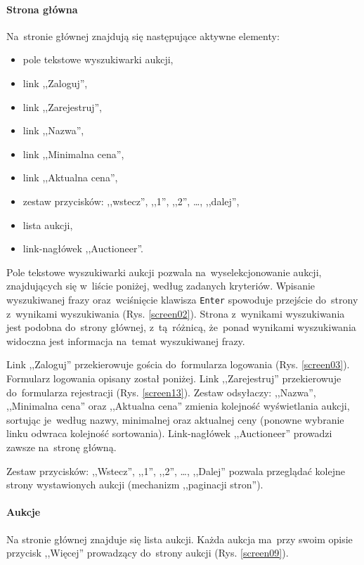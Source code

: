 \paragraph{Strona główna}

Na~stronie głównej znajdują się następujące aktywne elementy:

\begin{itemize}
  \item pole tekstowe wyszukiwarki aukcji,
  \item link ,,Zaloguj'',
  \item link ,,Zarejestruj'',
  \item link ,,Nazwa'',
  \item link ,,Minimalna cena'',
  \item link ,,Aktualna cena'',
  \item zestaw przycisków: ,,wstecz'', ,,1'', ,,2'', \ldots, ,,dalej'',
  \item lista aukcji,
  \item link-nagłówek ,,Auctioneer''.
\end{itemize}

Pole tekstowe wyszukiwarki aukcji pozwala na~wyselekcjonowanie aukcji, znajdujących się w~liście poniżej, według zadanych kryteriów. Wpisanie wyszukiwanej frazy oraz~wciśnięcie klawisza \texttt{Enter} spowoduje przejście do~strony z~wynikami wyszukiwania (Rys. \ref{screen02}). Strona z~wynikami wyszukiwania jest podobna do~strony głównej, z~tą~różnicą, że~ponad wynikami wyszukiwania widoczna jest informacja na~temat wyszukiwanej frazy.


Link ,,Zaloguj'' przekierowuje gościa do~formularza logowania (Rys. \ref{screen03}). Formularz logowania opisany został poniżej. Link ,,Zarejestruj'' przekierowuje do~formularza rejestracji (Rys. \ref{screen13}). Zestaw odsyłaczy: ,,Nazwa'', ,,Minimalna cena'' oraz ,,Aktualna cena''  zmienia kolejność wyświetlania aukcji, sortując je~według nazwy, minimalnej oraz aktualnej ceny (ponowne wybranie linku odwraca kolejność sortowania). Link-nagłówek ,,Auctioneer'' prowadzi zawsze na~stronę główną.


Zestaw przycisków: ,,Wstecz'', ,,1'', ,,2'', \ldots, ,,Dalej'' pozwala przeglądać kolejne strony wystawionych aukcji (mechanizm ,,paginacji stron'').


\paragraph{Aukcje}

Na stronie głównej znajduje się lista aukcji. Każda aukcja ma~przy swoim opisie przycisk ,,Więcej'' prowadzący do~strony aukcji (Rys. \ref{screen09}).


